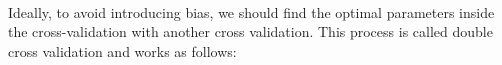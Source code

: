 \documentclass[a4paper,12pt,oneside,final]{report}
\begin{document}
\paragraph{}
Ideally, to avoid introducing bias, we should find the optimal parameters inside the cross-validation with another cross validation. This process is called double cross validation and works as follows:
\end{document}
